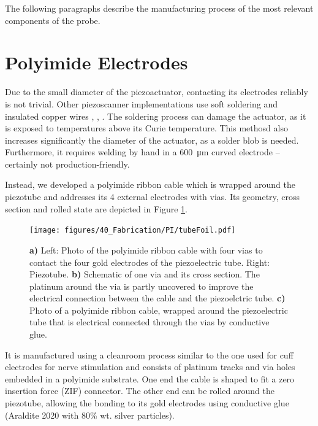 The following paragraphs describe the manufacturing process of the most relevant components of the probe.

\clearpage
\section{Polyimide Electrodes}
Due to the small diameter of the piezoactuator, contacting its electrodes reliably is not trivial. Other piezoscanner implementations use soft soldering and insulated copper wires \cite{Lee2010}, \cite{Meinert}, \cite{Huo2010}. The soldering process can damage the actuator, as it is exposed to temperatures above its Curie temperature. This methosd also increases significantly the diameter of the actuator, as a solder blob is needed. Furthermore, it requires welding by hand in a \SI{600}{\micro\meter} curved electrode -- certainly not production-friendly.



Instead, we developed a polyimide ribbon cable which is wrapped around the piezotube and addresses its 4 external electrodes with vias. Its geometry, cross section and rolled state are depicted in Figure \ref{fig:piRolled}. 

\begin{figure}[h!]\centering \texttt{[image: figures/40\_Fabrication/PI/tubeFoil.pdf]}
      \caption{\textbf{a)} Left: Photo of the polyimide ribbon cable with four vias to contact the four gold electrodes of the piezoelectric tube. Right: Piezotube.
      \textbf{b)} Schematic of one via and its cross section. The platinum around the via is partly uncovered to improve the electrical connection between the cable and the piezoelctric tube.
      \textbf{c)} Photo of a polyimide ribbon cable, wrapped around the piezoelectric tube that is electrical connected through the vias by conductive glue.}
      \label{fig:piRolled}
\end{figure}

It is manufactured using a cleanroom process similar to the one used for cuff electrodes for nerve stimulation \cite{Rodriguez2000} and consists of platinum tracks and via holes embedded in a polyimide substrate. One end the cable is shaped to fit a zero insertion force (ZIF) connector. The other end can be rolled around the piezotube, allowing the bonding to its gold electrodes using conductive glue (Araldite 2020 with 80\% wt. silver particles).


